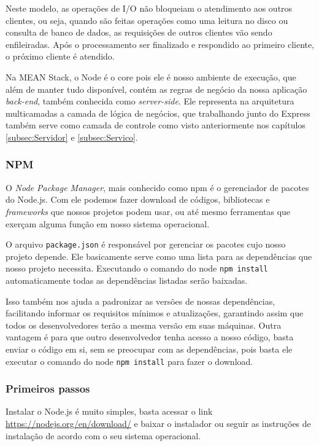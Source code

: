 \documentclass[
	12pt,				%
	openright,			%
	twoside,			%
	a4paper,			%
	english,			%
	brazil				%
	]{abntex2}
\begin{document}
Neste modelo, as operações de I/O não bloqueiam o atendimento aos outros clientes, ou seja, quando são feitas operações como uma leitura no disco ou consulta de banco de dados, as requisições de outros clientes vão sendo enfileiradas. Após o processamento ser finalizado e respondido ao primeiro cliente, o próximo cliente é atendido.

Na MEAN Stack, o Node é o core pois ele é nosso ambiente de execução, que além de manter tudo disponível, contém as regras de negócio da nossa aplicação \textit{back-end}, também conhecida como \textit{server-side}. Ele representa na arquitetura multicamadas a camada de lógica de negócios, que trabalhando junto do Express também serve como camada de controle como visto anteriormente nos capítulos \ref{subsec:Servidor} e \ref{subsec:Servico}.

\subsubsection{NPM}

O \textit{Node Package Manager}, mais conhecido como npm é o gerenciador de pacotes do Node.js. Com ele podemos fazer download de códigos, bibliotecas e \textit{frameworks} que nossos projetos podem usar, ou até mesmo ferramentas que exerçam alguma função em nosso sistema operacional.

O arquivo \verb|package.json| é responsável por gerenciar os pacotes cujo nosso projeto depende. Ele basicamente serve como uma lista para as dependências que nosso projeto necessita. Executando o comando do node \verb|npm install| automaticamente todas as dependências listadas serão baixadas.

Isso também nos ajuda a padronizar as versões de nossas dependências, facilitando informar os requisitos mínimos e atualizações, garantindo assim que todos os desenvolvedores terão a mesma versão em suas máquinas. Outra vantagem é para que outro desenvolvedor tenha acesso a nosso código, basta enviar o código em si, sem se preocupar com as dependências, pois basta ele executar o comando do node \verb|npm install| para fazer o download.

\subsubsection {Primeiros passos}
\label{subsec:NodePrimeirosPassos}

Instalar o Node.js é muito simples, basta acessar o link \href{https://nodejs.org/en/download/}{https://nodejs.org/en/download/} e baixar o instalador ou seguir as instruções de instalação de acordo com o seu sistema operacional.
\end{document}
